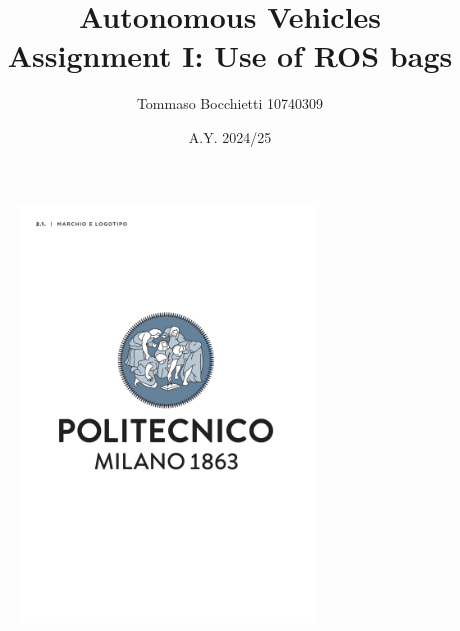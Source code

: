 \documentclass{assignment}
\begin{document}
\title{Autonomous Vehicles \\ Assignment I: Use of ROS bags}
\author{Tommaso Bocchietti 10740309}
\date{A.Y. 2024/25}

\maketitle

\begin{figure}[H]
    \centering
    \includegraphics[width=0.7\textwidth]{./pdf/Polimi_logo_coverpage.pdf}
    \label{fig:Polimi_logo}
\end{figure}

\clearpage
\tableofcontents
\listoffigures

\clearpage





\vspace*{\fill}
\nocite{*}


\end{document}
